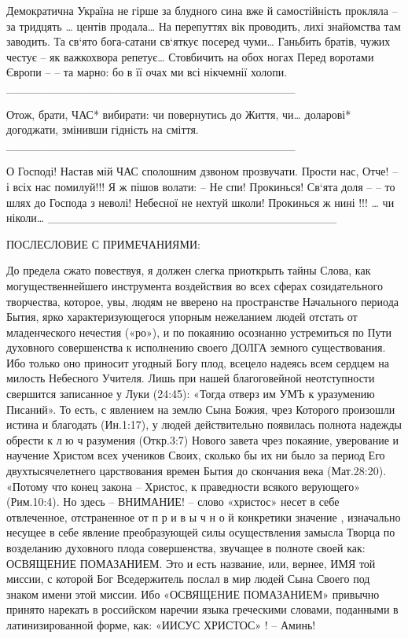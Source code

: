 Демократична Україна
не гірше за блудного сина
вже й самостійність прокляла –
за тридцять … центів продала…
              На перепуттях вік проводить,
              лихі знайомства там заводить.
              Та св‘ято бога-сатани
              св‘яткує посеред чуми…
              Ганьбить братів, чужих честує –
              як важкохвора репетує…
              Стовбичить на обох ногах
              Перед воротами Європи –
              – та марно:  бо в її очах
              ми всі нікчемнії холопи.
___________________________________

Отож, брати, ЧАС*  вибирати:
чи повернутись до Життя,
чи…  доларові* догоджати,
змінивши гідність на сміття.
___________________________________

              О Господі!  Настав мій  ЧАС
              сполошним дзвоном  прозвучати.
              Прости нас,  Отче!  – і всіх нас
              помилуй!!!
                Я ж пішов волати:
              – Не спи!  Прокинься!  Св‘ята доля –
              – то шлях до  Господа з неволі!
              Небесної не нехтуй школи!
              Прокинься ж нині !!!
                … чи ніколи…
___________________________________


               ПОСЛЕСЛОВИЕ С ПРИМЕЧАНИЯМИ:

     До предела сжато повествуя, я должен слегка приоткрыть тайны Слова, как могущественнейшего инструмента воздействия во всех сферах созидательного творчества, которое, увы, людям не вверено на пространстве Начального периода Бытия, ярко характеризующегося упорным нежеланием людей отстать от младенческого нечестия («ро»), и по покаянию осознанно устремиться по Пути духовного совершенства к исполнению своего ДОЛГА земного существования. Ибо только оно приносит угодный Богу плод, всецело надеясь всем сердцем на милость Небесного Учителя. Лишь при нашей благоговейной неотступности свершится записанное у Луки (24:45): «Тогда отверз им  УМЪ к уразумению Писаний».
То есть, с явлением на землю Сына Божия, чрез Которого произошли истина и благодать (Ин.1:17), у людей действительно появилась полнота надежды обрести  к л ю ч  разумения (Откр.3:7) Нового завета чрез покаяние, уверование и научение Христом всех учеников Своих, сколько бы их ни было за период Его двухтысячелетнего царствования времен Бытия до скончания века (Мат.28:20). «Потому что конец закона – Христос, к праведности всякого верующего» (Рим.10:4).  Но здесь –  ВНИМАНИЕ! – слово «христос» несет в себе отвлеченное, отстраненное от  п р и в ы ч н о й  конкретики значение , изначально несущее в себе явление преобразующей силы осуществления замысла Творца по возделанию духовного плода совершенства, звучащее в полноте своей как: ОСВЯЩЕНИЕ  ПОМАЗАНИЕМ.  Это и есть название, или, вернее, ИМЯ той миссии, с которой Бог Вседержитель послал в мир людей Сына Своего под знаком имени этой миссии. Ибо «ОСВЯЩЕНИЕ ПОМАЗАНИЕМ» привычно принято нарекать в российском наречии языка греческими словами, поданными в латинизированной форме, как:  «ИИСУС ХРИСТОС» ! –  Аминь!


